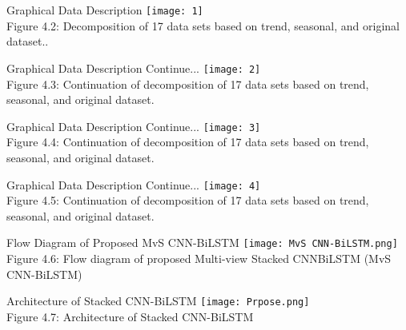 \documentclass[12pt, aspectratio=169]{beamer}
\begin{document}
\begin{frame}{Graphical Data Description }
	\centering
	\texttt{[image: 1]}\\ 
	\scriptsize{Figure 4.2: Decomposition of 17 data sets based on trend, seasonal, and original dataset..}
\end{frame}

\begin{frame}{Graphical Data Description \tiny{Continue...}}
	\centering
	\texttt{[image: 2]}\\
	\scriptsize{Figure 4.3: Continuation of decomposition of 17 data sets based on trend, seasonal, and original dataset.}
\end{frame}

\begin{frame}{Graphical Data Description \tiny{Continue...}}
	\centering
	\texttt{[image: 3]}\\
	\scriptsize{Figure 4.4: Continuation of decomposition of 17 data sets based on trend, seasonal, and original dataset.}
\end{frame}

\begin{frame}{Graphical Data Description \tiny{Continue...}}
	\centering
	\texttt{[image: 4]}\\
	\scriptsize{Figure 4.5: Continuation of decomposition of 17 data sets based on trend, seasonal, and original dataset.}
\end{frame}


\begin{frame}{Flow Diagram of Proposed MvS CNN-BiLSTM}
	\centering
	\texttt{[image: MvS CNN-BiLSTM.png]}\\
	\scriptsize{Figure 4.6: Flow diagram of proposed Multi-view Stacked CNNBiLSTM (MvS CNN-BiLSTM)}
\end{frame}
\begin{frame}{Architecture of Stacked CNN-BiLSTM}
	\centering
	\texttt{[image: Prpose.png]}\\
	\scriptsize{Figure 4.7: Architecture of Stacked CNN-BiLSTM}
\end{frame}
\end{document}
